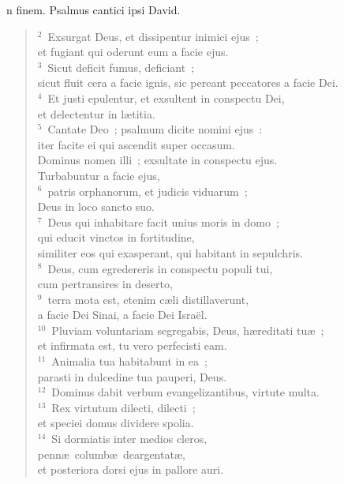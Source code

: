 \bchapter
{}n finem. Psalmus cantici ipsi David.
\begin{flushleft}\begin{verse}\vspace{6pt}${}^{2}$~Exsurgat Deus, et dissipentur inimici ejus~;\\ et fugiant qui oderunt eum a facie ejus.\\
${}^{3}$~Sicut deficit fumus, deficiant~;\\ sicut fluit cera a facie ignis, sic pereant peccatores a facie Dei.\\
${}^{4}$~Et justi epulentur, et exsultent in conspectu Dei,\\ et delectentur in l\ae titia.\\
${}^{5}$~Cantate Deo~; psalmum dicite nomini ejus~:\\ iter facite ei qui ascendit super occasum.\\ Dominus nomen illi~; exsultate in conspectu ejus.\\ Turbabuntur a facie ejus,\\
${}^{6}$~patris orphanorum, et judicis viduarum~;\\ Deus in loco sancto suo.\\
${}^{7}$~Deus qui inhabitare facit unius moris in domo~;\\ qui educit vinctos in fortitudine,\\ similiter eos qui exasperant, qui habitant in sepulchris.\\
${}^{8}$~Deus, cum egredereris in conspectu populi tui,\\ cum pertransires in deserto,\\
${}^{9}$~terra mota est, etenim c\ae li distillaverunt,\\ a facie Dei Sinai, a facie Dei Isra\"el.\\
${}^{10}$~Pluviam voluntariam segregabis, Deus, h\ae reditati tu\ae~;\\ et infirmata est, tu vero perfecisti eam.\\
${}^{11}$~Animalia tua habitabunt in ea~;\\ parasti in dulcedine tua pauperi, Deus.\\
${}^{12}$~Dominus dabit verbum evangelizantibus, virtute multa.\\
${}^{13}$~Rex virtutum dilecti, dilecti~;\\ et speciei domus dividere spolia.\\
${}^{14}$~Si dormiatis inter medios cleros,\\ penn\ae\ columb\ae\ deargentat\ae ,\\ et posteriora dorsi ejus in pallore auri.\\

\end{verse}
\end{flushleft}
